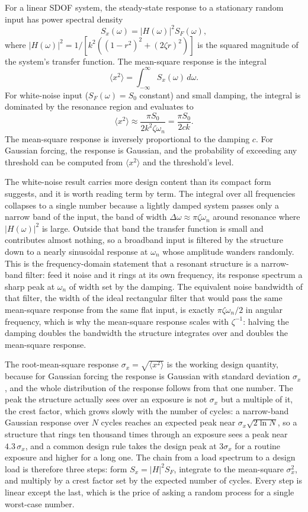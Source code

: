For a linear SDOF system, the steady-state response to a stationary
random input has power spectral density
\[
S_x(\omega) = |H(\omega)|^2 S_F(\omega),
\]
where $|H(\omega)|^2 = 1/[k^2 ((1-r^2)^2 + (2\zeta r)^2)]$ is the
squared magnitude of the system's transfer function. The mean-square
response is the integral
\[
\langle x^2 \rangle = \int_{-\infty}^{\infty} S_x(\omega) \,d\omega.
\]
For white-noise input ($S_F(\omega) = S_0$ constant) and small
damping, the integral is dominated by the resonance region and
evaluates to
\[
\langle x^2 \rangle \approx \frac{\pi S_0}{2 k^2 \zeta \omega_n} =
\frac{\pi S_0}{2 c k}.
\]
The mean-square response is inversely proportional to the damping
$c$. For Gaussian forcing, the response is Gaussian, and the
probability of exceeding any threshold can be computed from
$\langle x^2 \rangle$ and the threshold's level.

The white-noise result carries more design content than its compact
form suggests, and it is worth reading term by term. The integral over
all frequencies collapses to a single number because a lightly damped
system passes only a narrow band of the input, the band of width
$\Delta\omega \approx \pi\zeta\omega_n$ around resonance where
$|H(\omega)|^2$ is large. Outside that band the transfer function is
small and contributes almost nothing, so a broadband input is filtered
by the structure down to a nearly sinusoidal response at $\omega_n$
whose amplitude wanders randomly. This is the frequency-domain statement
that a resonant structure is a narrow-band filter: feed it noise and it
rings at its own frequency, its response spectrum a sharp peak at
$\omega_n$ of width set by the damping. The equivalent noise bandwidth
of that filter, the width of the ideal rectangular filter that would
pass the same mean-square response from the same flat input, is exactly
$\pi\zeta\omega_n/2$ in angular frequency, which is why the mean-square
response scales with $\zeta^{-1}$: halving the damping doubles the
bandwidth the structure integrates over and doubles the mean-square
response.

The root-mean-square response $\sigma_x = \sqrt{\langle x^2\rangle}$ is
the working design quantity, because for Gaussian forcing the response is
Gaussian with standard deviation $\sigma_x$, and the whole distribution
of the response follows from that one number. The peak the structure
actually sees over an exposure is not $\sigma_x$ but a multiple of it,
the crest factor, which grows slowly with the number of cycles: a
narrow-band Gaussian response over $N$ cycles reaches an expected peak
near $\sigma_x\sqrt{2\ln N}$, so a structure that rings ten thousand
times through an exposure sees a peak near $4.3\,\sigma_x$, and a
common design rule takes the design peak at $3\sigma_x$ for a routine
exposure and higher for a long one. The chain from a load spectrum to a
design load is therefore three steps: form $S_x = |H|^2 S_F$, integrate
to the mean-square $\sigma_x^2$, and multiply by a crest factor set by
the expected number of cycles. Every step is linear except the last,
which is the price of asking a random process for a single worst-case
number.

